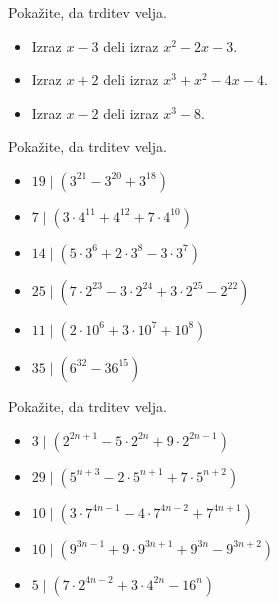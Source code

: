     
        \begin{naloga}
            Pokažite, da trditev velja.
            \begin{itemize}
                \item Izraz $x-3$ deli izraz $x^2-2x-3$. 
                \item Izraz $x+2$ deli izraz $x^3+x^2-4x-4$. 
                \item Izraz $x-2$ deli izraz $x^3-8$. 
            \end{itemize}
        \end{naloga}        

    
        \begin{naloga}
            Pokažite, da trditev velja.
            \begin{itemize}
                \item $19\mid \left(3^{21}-3^{20}+3^{18}\right)$ 
                \item $7\mid \left(3\cdot 4^{11}+4^{12}+7\cdot 4^{10}\right)$ 
                \item $14\mid \left(5\cdot 3^6+2\cdot 3^8-3\cdot 3^7\right)$ 
                \item $25\mid \left(7\cdot 2^{23}-3\cdot 2^{24}+3\cdot 2^{25}-2^{22}\right)$ 
                \item $11\mid \left(2\cdot 10^6+3\cdot 10^7+10^8\right)$ 
                \item $35\mid \left(6^{32}-36^{15}\right)$ 
            \end{itemize}
        \end{naloga}        

    
        \begin{naloga}
            Pokažite, da trditev velja.
            \begin{itemize}
                \item $3\mid \left(2^{2n+1}-5\cdot 2^{2n}+9\cdot 2^{2n-1}\right)$ 
                \item $29\mid \left(5^{n+3}-2\cdot 5^{n+1}+7\cdot 5^{n+2}\right)$ 
                \item $10\mid \left(3\cdot 7^{4n-1}-4\cdot 7^{4n-2}+7^{4n+1}\right)$ 
                \item $10\mid \left(9^{3n-1}+9\cdot 9^{3n+1}+9^{3n}-9^{3n+2}\right)$ 
                \item $5\mid \left(7\cdot 2^{4n-2}+3\cdot 4^{2n}-16^n\right)$ 
            \end{itemize}
        \end{naloga}        


